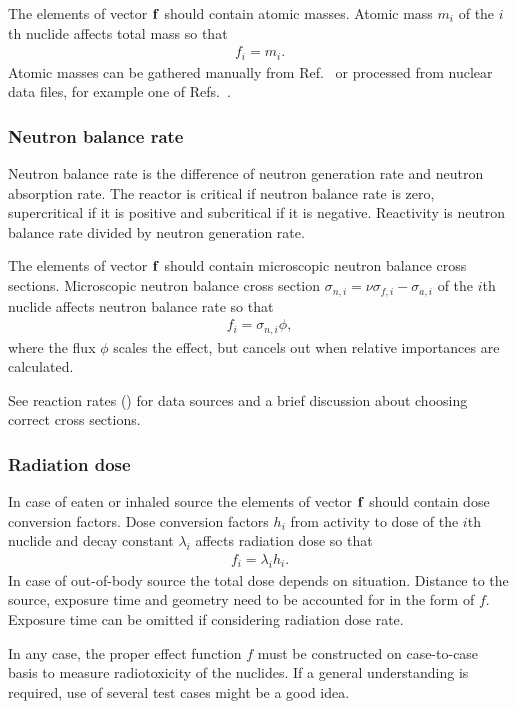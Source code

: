 The elements of vector $\mathbf{f}$ should contain atomic masses. Atomic mass $m_i$ of the $i$th nuclide affects total mass so that
%
\begin{gather}
f_i = m_i.
\end{gather}
%
Atomic masses can be gathered manually from Ref.~\cite{nndc} or processed from nuclear data files, for example one of Refs.~\cite{jendl,jeff,cendl,brond,endf}.

\subsubsection*{Neutron balance rate}

Neutron balance rate is the difference of neutron generation rate and neutron absorption rate. The reactor is critical if neutron balance rate is zero, supercritical if it is positive and subcritical if it is negative. Reactivity is neutron balance rate divided by neutron generation rate.

The elements of vector $\mathbf{f}$ should contain microscopic neutron balance cross sections. Microscopic neutron balance cross section $\sigma_{n,i}=\nu\sigma_{f,i}-\sigma_{a,i}$ of the $i$th nuclide affects neutron balance rate so that
%
\begin{gather}
f_i = \sigma_{n,i}\phi,
\end{gather}
%
where the flux $\phi$ scales the effect, but cancels out when relative importances are calculated.

See reaction rates () for data sources and a brief discussion about choosing correct cross sections.

\subsubsection*{Radiation dose}

In case of eaten or inhaled source the elements of vector $\mathbf{f}$ should contain dose conversion factors. Dose conversion factors $h_i$ from activity to dose of the $i$th nuclide and decay constant $\lambda_i$ affects radiation dose so that
%
\begin{gather}
f_i = \lambda_ih_i.
\end{gather}
%
In case of out-of-body source the total dose depends on situation. Distance to the source, exposure time and geometry need to be accounted for in the form of $f$. Exposure time can be omitted if considering radiation dose rate.

In any case, the proper effect function $f$ must be constructed on case-to-case basis to measure radiotoxicity of the nuclides. If a general understanding is required, use of several test cases might be a good idea.

